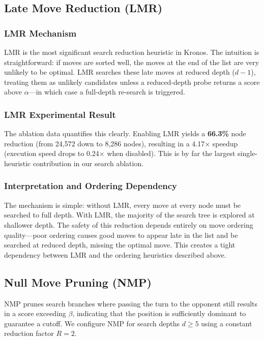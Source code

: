\subsection{Late Move Reduction (LMR)}

\subsubsection{LMR Mechanism}
LMR is the most significant search reduction heuristic in Kronos. The intuition is straightforward: if moves are sorted well, the moves at the end of the list are very unlikely to be optimal. LMR searches these late moves at reduced depth ($d - 1$), treating them as unlikely candidates unless a reduced-depth probe returns a score above $\alpha$—in which case a full-depth re-search is triggered.

\subsubsection{LMR Experimental Result}
The ablation data quantifies this clearly. Enabling LMR yields a \textbf{66.3\%} node reduction (from 24,572 down to 8,286 nodes), resulting in a 4.17× speedup (execution speed drops to 0.24× when disabled). This is by far the largest single-heuristic contribution in our search ablation.

\subsubsection{Interpretation and Ordering Dependency}
The mechanism is simple: without LMR, every move at every node must be searched to full depth. With LMR, the majority of the search tree is explored at shallower depth. The safety of this reduction depends entirely on move ordering quality—poor ordering causes good moves to appear late in the list and be searched at reduced depth, missing the optimal move. This creates a tight dependency between LMR and the ordering heuristics described above.




\subsection{Null Move Pruning (NMP)}
NMP prunes search branches where passing the turn to the opponent still results in a score exceeding $\beta$, indicating that the position is sufficiently dominant to guarantee a cutoff. We configure NMP for search depths $d \ge 5$ using a constant reduction factor $R = 2$.

